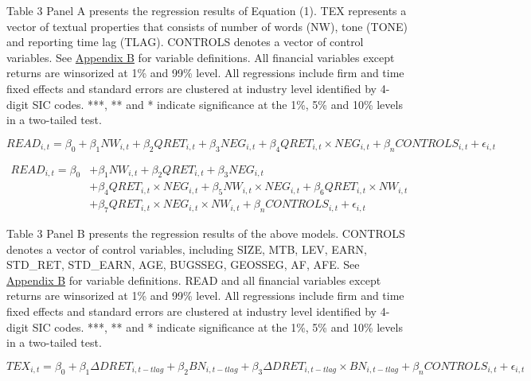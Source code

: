 Table 3 Panel A presents the regression results of Equation (1). TEX represents a vector of textual properties that consists of number of words (NW), tone (TONE) and reporting time lag (TLAG). CONTROLS denotes a vector of control variables. See \hyperref[appb]{Appendix B} for variable definitions. All financial variables except returns are winsorized at 1\% and 99\% level. All regressions include firm and time fixed effects and standard errors are clustered at industry level identified by 4-digit SIC codes. ***, ** and * indicate significance at the 1\%, 5\% and 10\% levels in a two-tailed test.

\newpage

\setcounter{equation}{0}
\begin{equation*}
	READ_{i,t}=\beta_0+\beta_1NW_{i,t}+\beta_2QRET_{i,t}+\beta_3NEG_{i,t}+\beta_4QRET_{i,t}\times NEG_{i,t}+\beta_nCONTROLS_{i,t}+\epsilon_{i,t}
\end{equation*}

\begin{equation*}
	\begin{split}
		READ_{i,t}=\beta_0&+\beta_1NW_{i,t}+\beta_2QRET_{i,t}+\beta_3NEG_{i,t}\\
		&+\beta_4QRET_{i,t}\times NEG_{i,t}+\beta_5NW_{i,t}\times NEG_{i,t}+\beta_6QRET_{i,t}\times NW_{i,t}\\
		&+\beta_7QRET_{i,t}\times NEG_{i,t}\times NW_{i,t}+\beta_nCONTROLS_{i,t}+\epsilon_{i,t}
	\end{split}
\end{equation*}

Table 3 Panel B presents the regression results of the above models. CONTROLS denotes a vector of control variables, including SIZE, MTB, LEV, EARN, STD\_RET, STD\_EARN, AGE, BUGSSEG, GEOSSEG, AF, AFE. See \hyperref[appb]{Appendix B} for variable definitions. READ and all financial variables except returns are winsorized at 1\% and 99\% level. All regressions include firm and time fixed effects and standard errors are clustered at industry level identified by 4-digit SIC codes. ***, ** and * indicate significance at the 1\%, 5\% and 10\% levels in a two-tailed test.

\newpage

\setcounter{equation}{1}
\begin{equation}
TEX_{i,t}=\beta_0+\beta_1\Delta DRET_{i,t-tlag}+\beta_2BN_{i,t-tlag}+\beta_3\Delta DRET_{i,t-tlag}\times BN_{i,t-tlag}+\beta_nCONTROLS_{i,t}+\epsilon_{i,t}
\end{equation}
\newline

